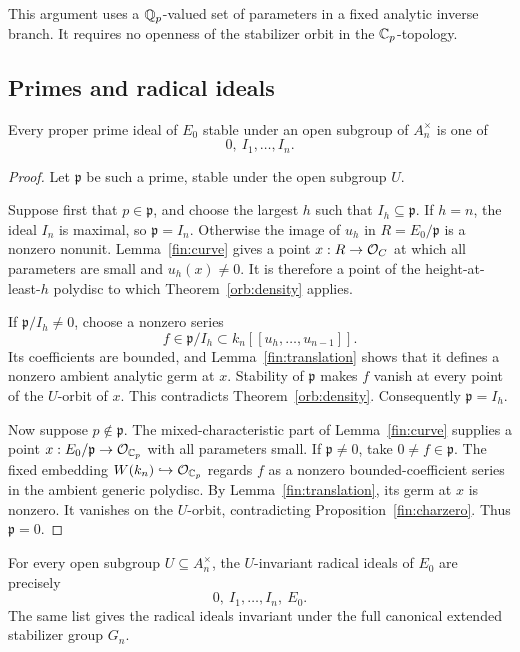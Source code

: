 This argument uses a \(\mathbb Q_p\)-valued set of parameters in a fixed
analytic inverse branch.  It requires no openness of the stabilizer
orbit in the \(\mathbb C_p\)-topology.

\subsection{Primes and radical ideals}

\begin{theorem}\label{fin:primes}
Every proper prime ideal of \(E_0\) stable under an open subgroup of
\(A_n^\times\) is one of
\[
  0,\ I_1,\ldots,I_n.
\]
\end{theorem}

\begin{proof}
Let \(\mathfrak p\) be such a prime, stable under the open subgroup
\(U\).

Suppose first that \(p\in\mathfrak p\), and choose the largest \(h\)
such that \(I_h\subseteq\mathfrak p\).  If \(h=n\), the ideal \(I_n\)
is maximal, so \(\mathfrak p=I_n\).  Otherwise the image of \(u_h\)
in \(R=E_0/\mathfrak p\) is a nonzero nonunit.
Lemma~\ref{fin:curve} gives a point \(x:R\to\mathcal O_C\) at which all
parameters are small and \(u_h(x)\ne0\).
It is therefore a point of the height-at-least-\(h\) polydisc to
which Theorem~\ref{orb:density} applies.

If \(\mathfrak p/I_h\ne0\), choose a nonzero series
\[
  f\in\mathfrak p/I_h
     \subset k_n[[u_h,\ldots,u_{n-1}]].
\]
Its coefficients are bounded, and Lemma~\ref{fin:translation} shows
that it defines a nonzero ambient analytic germ at \(x\).
Stability of \(\mathfrak p\) makes \(f\) vanish at every point of the
\(U\)-orbit of \(x\).
This contradicts Theorem~\ref{orb:density}.
Consequently \(\mathfrak p=I_h\).

Now suppose \(p\notin\mathfrak p\).
The mixed-characteristic part of Lemma~\ref{fin:curve} supplies a point
\(x:E_0/\mathfrak p\to\mathcal O_{\mathbb C_p}\) with all parameters small.
If \(\mathfrak p\ne0\), take \(0\ne f\in\mathfrak p\).
The fixed embedding \(W(k_n)\hookrightarrow\mathcal O_{\mathbb C_p}\) regards \(f\)
as a nonzero bounded-coefficient series in the ambient generic
polydisc.  By Lemma~\ref{fin:translation}, its germ at \(x\) is
nonzero.  It vanishes on the \(U\)-orbit, contradicting
Proposition~\ref{fin:charzero}.  Thus \(\mathfrak p=0\).
\end{proof}

\begin{corollary}\label{fin:radicals}
For every open subgroup \(U\subseteq A_n^\times\), the
\(U\)-invariant radical ideals of \(E_0\) are precisely
\[
  0,\ I_1,\ldots,I_n,\ E_0.
\]
The same list gives the radical ideals invariant under the full
canonical extended stabilizer group \(G_n\).
\end{corollary}

